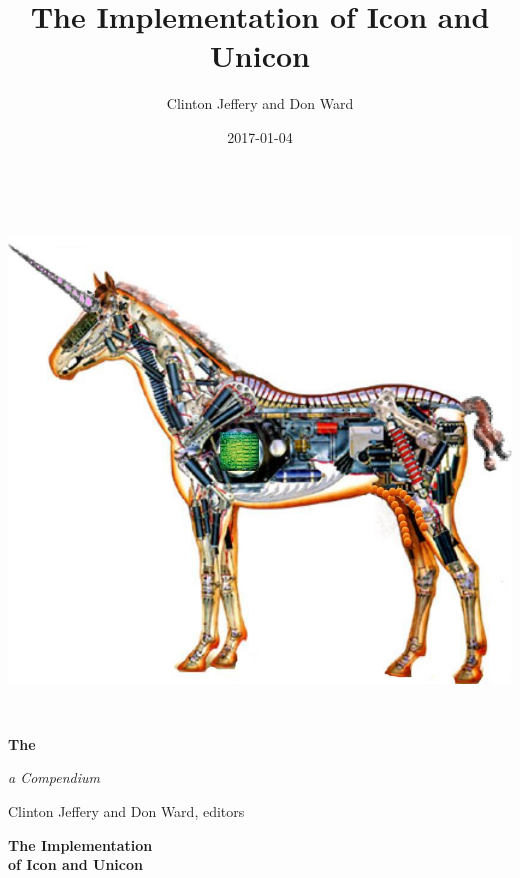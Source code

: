 \documentclass[letterpaper,twoside,12pt]{book}
\title{The Implementation of Icon and Unicon}
\author{Clinton Jeffery and Don Ward}
\date{2017-01-04}
\newcommand*{\TitleFont}{%
      \usefont{\encodingdefault}{\rmdefault}{b}{n}%
      \fontsize{256}{40}%
      \selectfont}
\begin{document}
\clearpage\clearpage\setcounter{page}{1}\pagestyle{KonvertFolgeii}
\thispagestyle{Konverti}
\begin{center}
\includegraphics[width=5.9992in,height=5.3402in]{ib-img/ib-img001.jpg}
\end{center}
{\color{black}
\bfseries\Huge
The \vspace{0.15in}

\noindent \TitleFont
\colorbox{blue}{\makebox[6in][r]{\parbox{6in}{\center\textcolor{white}{Implementation of\\ Icon and Unicon} \vspace{0.25in}}}}
}

\vspace{0.10in}

{\raggedleft\itshape\huge
a Compendium
\par}

\bigskip

{\raggedleft\LARGE
Clinton Jeffery and Don Ward, editors
\par}

\clearpage\setcounter{page}{1}\pagestyle{UnnumberedKonvertFolgeii}
\parbox{1in}{}

\clearpage

\bigskip
\bigskip
\bigskip

{\centering\bfseries\Huge
The Implementation\\
of Icon and Unicon
\par}
\end{document}
